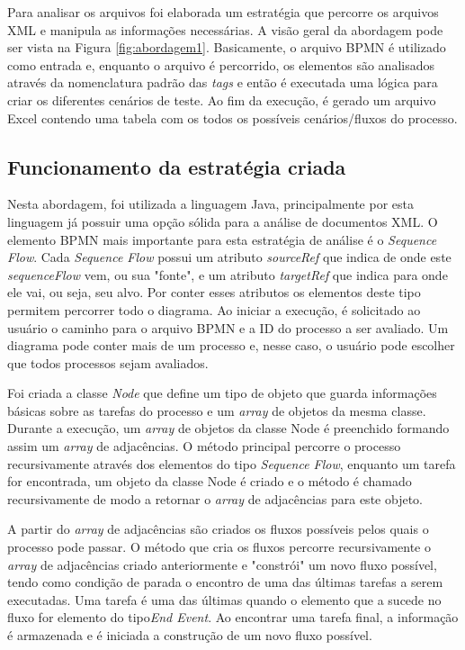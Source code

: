 \documentclass[12pt]{article}
\begin{document}
Para analisar os arquivos foi elaborada um estratégia que percorre os arquivos XML e manipula as informações necessárias. A visão geral da abordagem pode ser vista na Figura \ref{fig:abordagem1}. Basicamente, o arquivo BPMN é utilizado como entrada e, enquanto o arquivo é percorrido, os elementos são analisados através da nomenclatura padrão das \emph{tags} e então é executada uma lógica para criar os diferentes cenários de teste. Ao fim da execução, é gerado um arquivo Excel contendo uma tabela com os todos os possíveis cenários/fluxos do processo.


\subsection{Funcionamento da estratégia criada}

Nesta abordagem, foi utilizada a linguagem Java, principalmente por esta linguagem já possuir uma opção sólida para a análise de documentos XML\cite{javadom}. O elemento BPMN mais importante para esta estratégia de análise é o \emph{Sequence Flow}. Cada \emph{Sequence Flow} possui um atributo \emph{sourceRef} que indica de onde este \emph{sequenceFlow} vem, ou sua "fonte", e um atributo \emph{targetRef} que indica para onde ele vai, ou seja, seu alvo. Por conter esses atributos os elementos deste tipo permitem percorrer todo o diagrama. Ao iniciar a execução, é solicitado ao usuário o caminho para o arquivo BPMN e a ID do processo a ser avaliado. Um diagrama pode conter mais de um processo e, nesse caso, o usuário pode escolher que todos processos sejam avaliados.

Foi criada a classe \emph{Node} que define um tipo de objeto que guarda informações básicas sobre as tarefas do processo e um \emph{array} de objetos da mesma classe. Durante a execução, um \emph{array} de objetos da classe Node é preenchido formando assim um \emph{array} de adjacências. O método principal percorre o processo recursivamente através dos elementos do tipo \emph{Sequence Flow}, enquanto um tarefa for encontrada, um objeto da classe Node é criado e o método é chamado recursivamente de modo a retornar o \emph{array} de adjacências para este objeto.

A partir do \emph{array} de adjacências são criados os fluxos possíveis pelos quais o processo pode passar. O método que cria os fluxos percorre recursivamente o \emph{array} de adjacências criado anteriormente e "constrói" um novo fluxo possível, tendo como condição de parada o encontro de uma das últimas tarefas a serem executadas. Uma tarefa é uma das últimas quando o elemento que a sucede no fluxo for elemento do tipo\emph{End Event}. Ao encontrar uma tarefa final, a informação é armazenada e é iniciada a construção de um novo fluxo possível.
\end{document}
